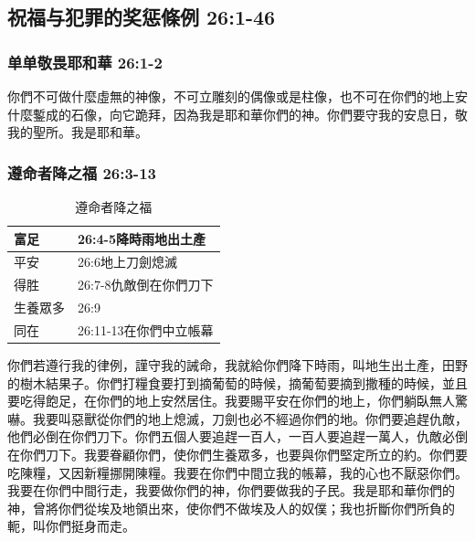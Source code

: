 \subsection{祝福与犯罪的奖惩條例 26:1-46}
\subsubsection{单单敬畏耶和華 26:1-2}
你們不可做什麼虛無的神像，不可立雕刻的偶像或是柱像，也不可在你們的地上安什麼鏨成的石像，向它跪拜，因為我是耶和華你們的神。你們要守我的安息日，敬我的聖所。我是耶和華。

\subsubsection{遵命者降之福 26:3-13}
\begin{table}
\vspace*{-4mm}
\centering
\begin{tabular}{l|l}
\toprule
富足&26:4-5降時雨地出土產 \tabularnewline\hline
平安&26:6地上刀劍熄滅 \tabularnewline\hline
得胜&26:7-8仇敵倒在你們刀下 \tabularnewline\hline
生養眾多&26:9\tabularnewline\hline
同在&26:11-13在你們中立帳幕 \tabularnewline\hline
\bottomrule
\end{tabular}
\caption{遵命者降之福}
\end{table} 
你們若遵行我的律例，謹守我的誡命，我就給你們降下時雨，叫地生出土產，田野的樹木結果子。你們打糧食要打到摘葡萄的時候，摘葡萄要摘到撒種的時候，並且要吃得飽足，在你們的地上安然居住。我要賜平安在你們的地上，你們躺臥無人驚嚇。我要叫惡獸從你們的地上熄滅，刀劍也必不經過你們的地。你們要追趕仇敵，他們必倒在你們刀下。你們五個人要追趕一百人，一百人要追趕一萬人，仇敵必倒在你們刀下。我要眷顧你們，使你們生養眾多，也要與你們堅定所立的約。你們要吃陳糧，又因新糧挪開陳糧。我要在你們中間立我的帳幕，我的心也不厭惡你們。我要在你們中間行走，我要做你們的神，你們要做我的子民。我是耶和華你們的神，曾將你們從埃及地領出來，使你們不做埃及人的奴僕；我也折斷你們所負的軛，叫你們挺身而走。

